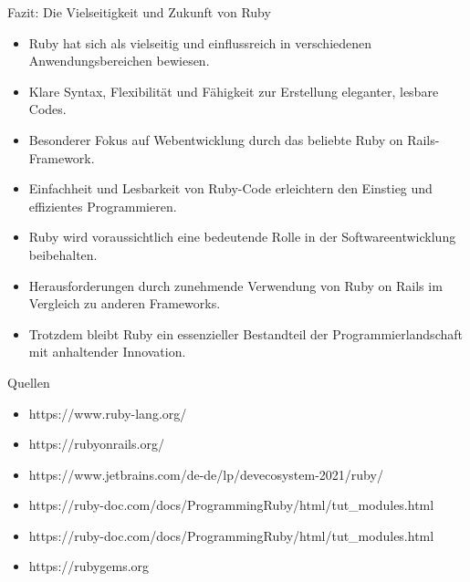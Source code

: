 \documentclass{beamer}
\begin{document}
\begin{frame}{Fazit: Die Vielseitigkeit und Zukunft von Ruby}
  \begin{itemize}
    \item Ruby hat sich als vielseitig und einflussreich in verschiedenen Anwendungsbereichen bewiesen.
    \item Klare Syntax, Flexibilität und Fähigkeit zur Erstellung eleganter, lesbare Codes.
    \item Besonderer Fokus auf Webentwicklung durch das beliebte Ruby on Rails-Framework.
    \item Einfachheit und Lesbarkeit von Ruby-Code erleichtern den Einstieg und effizientes Programmieren.
    \item Ruby wird voraussichtlich eine bedeutende Rolle in der Softwareentwicklung beibehalten.
    \item Herausforderungen durch zunehmende Verwendung von Ruby on Rails im Vergleich zu anderen Frameworks.
    \item Trotzdem bleibt Ruby ein essenzieller Bestandteil der Programmierlandschaft mit anhaltender Innovation.
  \end{itemize}
\end{frame}
\begin{frame}{Quellen}
  \begin{itemize}
    \item https://www.ruby-lang.org/
    \item https://rubyonrails.org/
    \item https://www.jetbrains.com/de-de/lp/devecosystem-2021/ruby/
    \item https://ruby-doc.com/docs/ProgrammingRuby/html/tut\_modules.html
    \item https://ruby-doc.com/docs/ProgrammingRuby/html/tut\_modules.html
  \item https://rubygems.org
  \end{itemize}
\end{frame}
\end{document}
